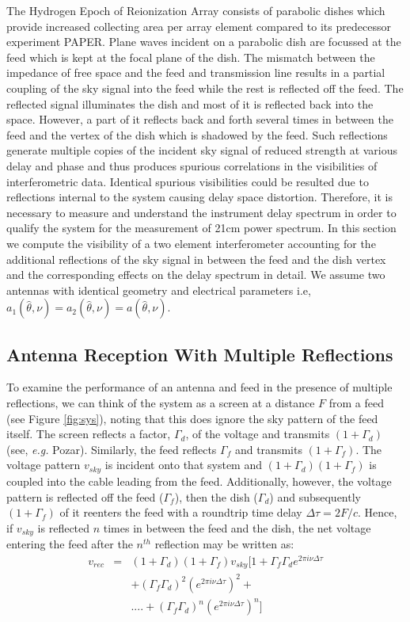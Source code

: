 \documentclass[twocolumn]{emulateapj}
\newcommand{\volt}{{v}}
\newcommand{\bmvolt}{{a}}
\newcommand{\thhat}{{\hat\theta}}
\newcommand{\dfngexp}{{e^{2\pi i\nu \Delta \tau}}}
\begin{document}
The Hydrogen Epoch of Reionization Array consists of parabolic dishes which
provide increased collecting area per array element compared to its predecessor
experiment PAPER. Plane waves incident on a parabolic dish are focussed at the
feed which is kept at the focal plane of the dish.  The mismatch between the
impedance of free space and the feed and transmission line results in a partial
coupling of the sky signal into the feed while the rest is reflected off the
feed.  The reflected signal illuminates the dish and most of it is reflected
back into the space.  However, a part of it reflects back and forth several
times in between the feed and the vertex of the dish which is shadowed by the
feed.  Such reflections generate multiple copies of the incident sky signal of
reduced strength at various delay and phase and thus produces spurious
correlations in the visibilities of interferometric data.  Identical spurious
visibilities could be resulted due to reflections internal to the system
causing delay space distortion. Therefore, it is necessary to measure and
understand the instrument delay spectrum in order to qualify the system for the
measurement of 21cm power spectrum.  In this section we compute the visibility
of a two element interferometer accounting for the additional reflections of
the sky signal in between the feed and the dish vertex and the corresponding
effects on the delay spectrum in detail. We assume two antennas with identical
geometry and electrical parameters i.e,
$\bmvolt_{1}(\thhat,\nu)=\bmvolt_{2}(\thhat,\nu) = \bmvolt(\thhat,\nu)$. 

 \subsection{Antenna Reception With Multiple Reflections}
\label{sec:multiple}

To examine the performance of an antenna and feed in the presence of multiple
reflections, we can think of the system as a screen at a distance $F$ from a
feed (see Figure \ref{fig:sys}), noting that this does ignore the sky pattern
of the feed itself.  The screen reflects a factor, $\Gamma_d$, of the voltage
and transmits $(1+\Gamma_d)$ (see, {\em e.g.} Pozar).  Similarly, the feed
reflects $\Gamma_f$ and transmits $(1+\Gamma_f)$.  The voltage pattern
$\volt_{sky}$ is incident onto that system and  $(1+\Gamma_{d})(1+\Gamma_{f})$
is coupled into the cable leading from the feed.  Additionally, however, the
voltage pattern is reflected off the feed ($\Gamma_f$), then the dish
($\Gamma_d$) and subsequently $(1+\Gamma_{f})$ of it reenters the feed with a
roundtrip time delay $\Delta \tau=2F/c$. Hence, if $v_{sky}$ is reflected $n$
times in between the feed and the dish, the net voltage entering the feed after
the $n^{th}$ reflection may be written as:
\begin{eqnarray}
\volt_{rec} & = &  (1+\Gamma_d) (1+\Gamma_{f}) \volt_{sky}[1+ \Gamma_{f}\Gamma_{d} \dfngexp \nonumber \\
	&& + (\Gamma_{f}\Gamma_{d})^2  (\dfngexp)^{2}+ \nonumber \\
&&  ....+ (\Gamma_{f}\Gamma_{d})^{n} (\dfngexp)^{n}]
\label{eq6}
\end{eqnarray}
\end{document}

